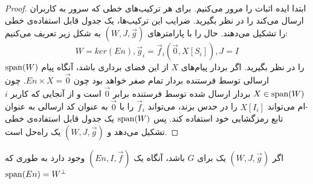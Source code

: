 \begin{proof}
    ابتدا ایده اثبات را مرور می‌کنیم. برای هر 
    \lpicod
    ترکیب‌های خطی که سرور به کاربران ارسال می‌کند را در نظر بگیرید. ضرایب این ترکیب‌ها، یک جدول قابل استفاده‌ی خطی را تشکیل می‌دهند.
حال
    \lpsicod
    را با پارامترهای
    $(W, J, \overrightarrow{g})$
     به شکل زیر تعریف می‌کنیم:
     $$W = ker(En), \overrightarrow{g}_i = \overrightarrow{f}_i(\overrightarrow{0}, X[S_i]), J = I$$
    $\operatorname{span}(W)$
     را در نظر بگیرید. اگر بردار پیام‌های
     $X$
      از این فضای برداری باشد، آنگاه پیام ارسالی توسط فرستنده بردار تمام صفر خواهد بود چون 
      $En \times X = \overrightarrow{0}$.
      چون
      $X \in \operatorname{span}(W)$
       بردار ارسال شده توسط فرستنده برابر
      $\overrightarrow{0}$
       است و از آنجایی که کاربر 
       $i$-ام
        می‌تواند 
       $X[I_i]$
        را در 
        \picod
         حدس بزند، می‌تواند
         $\overrightarrow{f}_i$ 
        را با 
        $\overrightarrow{0}$ 
        به عنوان کد ارسالی به عنوان تابع رمزگشایی خود استفاده کند. پس 
        $\operatorname{span}(W)$
         یک جدول قابل استفاده‌ی خطی تشکیل می‌دهد و 
        $(W, J, \overrightarrow{g})$ 
        یک راه‌حل است.
\end{proof}

\begin{lemma}
    اگر
     $(W, J, \overrightarrow{g})$
      یک 
      \lpsicod
       برای $G$ باشد، آنگاه یک
       \lpicod
        $(En, I, \overrightarrow{f})$
        وجود دارد به طوری که
         $\operatorname{span}(En) = W^{\bot}$
\end{lemma}

